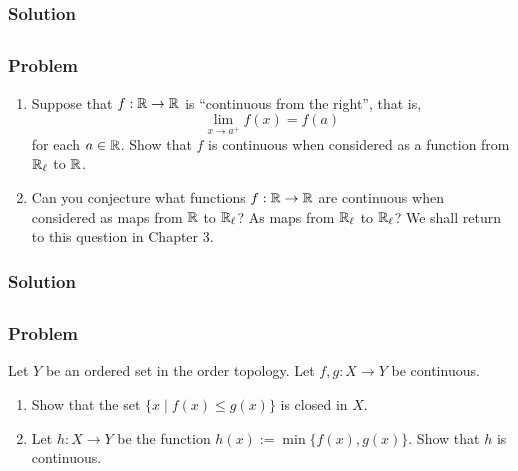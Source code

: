 \subsubsection{Solution}
\todo


\subsection{}

\subsubsection{Problem}
\begin{enumerate}
    \item Suppose that $f : \mathbb R \to \mathbb R$ is ``continuous from the right'', that is,
    \[ \lim_{x \to a^+}f(x) = f(a) \]
    for each $a \in \mathbb R$. Show that $f$ is continuous when considered as a function from $\mathbb R_\ell$ to $\mathbb R$.
    \item Can you conjecture what functions $f : \mathbb R \to \mathbb R$ are continuous when considered as maps from $\mathbb R$ to $\mathbb R_\ell$? As maps from $\mathbb R_\ell$ to $\mathbb R_\ell$? We shall return to this question in Chapter 3.
\end{enumerate}

\subsubsection{Solution}
\todo


\subsection{}

\subsubsection{Problem}
Let $Y$ be an ordered set in the order topology. Let $f, g : X \to Y$ be continuous.
\begin{enumerate}
    \item Show that the set $\{ x \mid f(x) \leq g(x) \}$ is closed in $X$.
    \item Let $h : X \to Y$ be the function $h(x) := \min\{ f(x), g(x) \}$. Show that $h$ is continuous.
\end{enumerate}


